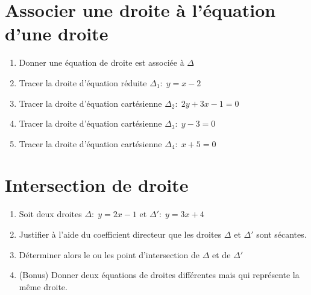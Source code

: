 \documentclass[french]{book}
\begin{document}
\section*{Associer une droite à l'équation d'une droite}
\begin{enumerate}
\item Donner une équation de droite est associée à $\Delta$
\item Tracer la droite d'équation réduite $\Delta_1: \; y = x-2$
\item Tracer la droite d'équation cartésienne  $\Delta_2: \; 2y+3x-1=0$
\item Tracer la droite d'équation cartésienne $\Delta_3: \; y-3=0$
\item Tracer la droite d'équation cartésienne $\Delta_4: \; x+5=0$
\end{enumerate}

\section*{Intersection de droite}
\begin{enumerate}
\item Soit deux droites $\Delta: \;  y=2x-1$ et $\Delta': \; y=3x+4$
\item Justifier à l'aide du coefficient directeur que les droites $\Delta$ et $\Delta'$ sont sécantes.
\item Déterminer alors le ou les point d'intersection de $\Delta$ et de $\Delta'$
\item (Bonus) Donner deux équations de droites différentes mais qui représente la même droite.
\end{enumerate}
\end{document}
